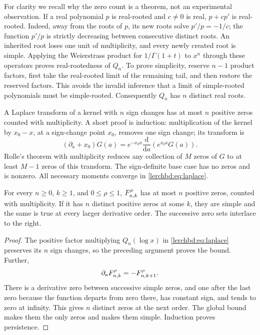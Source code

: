 For clarity we recall why the zero count is a theorem, not an experimental observation. If a real polynomial $p$ is real-rooted and $c\ne0$ is real, $p+cp'$ is real-rooted. Indeed, away from the roots of $p$, its new roots solve $p'/p=-1/c$; the function $p'/p$ is strictly decreasing between consecutive distinct roots. An inherited root loses one unit of multiplicity, and every newly created root is simple. Applying the Weierstrass product for $1/\Gamma(1+t)$ \cite{lerchbd:gamma} to $x^n$ through these operators proves real-rootedness of $Q_n$. To prove simplicity, reserve $n-1$ product factors, first take the real-rooted limit of the remaining tail, and then restore the reserved factors. This avoids the invalid inference that a limit of simple-rooted polynomials must be simple-rooted. Consequently $Q_n$ has $n$ distinct real roots.

A Laplace transform of a kernel with $n$ sign changes has at most $n$ positive zeros counted with multiplicity. A short proof is induction: multiplication of the kernel by $x_0-x$, at a sign-change point $x_0$, removes one sign change; its transform is
\[
 (\partial_a+x_0)G(a)=e^{-x_0a}\frac{\mathrm d}{\mathrm da}(e^{x_0a}G(a)).
\]
Rolle's theorem with multiplicity reduces any collection of $M$ zeros of $G$ to at least $M-1$ zeros of this transform. The sign-definite base case has no zeros and is nonzero. All necessary moments converge in \eqref{lerchbd:eq:laplace}.

\begin{proposition}\label{lerchbd:prop:bound}
For every $n\ge0$, $k\ge1$, and $0\le\rho\le1$, $F_{n,k}^{\rho}$ has at most $n$ positive zeros, counted with multiplicity. If it has $n$ distinct positive zeros at some $k$, they are simple and the same is true at every larger derivative order. The successive zero sets interlace to the right.
\end{proposition}
\begin{proof}
The positive factor multiplying $Q_n(\log x)$ in \eqref{lerchbd:eq:laplace} preserves its $n$ sign changes, so the preceding argument proves the bound. Further,
\begin{equation}\label{lerchbd:eq:derivative}
 \partial_aF_{n,k}^{\rho}=-F_{n,k+1}^{\rho}.
\end{equation}
There is a derivative zero between successive simple zeros, and one after the last zero because the function departs from zero there, has constant sign, and tends to zero at infinity. This gives $n$ distinct zeros at the next order. The global bound makes them the only zeros and makes them simple. Induction proves persistence.
\end{proof}

